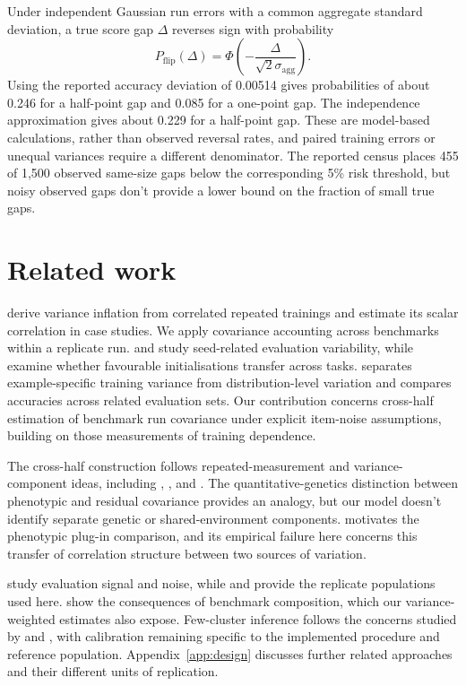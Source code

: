 \documentclass{article}
\begin{document}
Under independent Gaussian run errors with a common aggregate standard deviation, a true score gap $\Delta$ reverses sign with probability
\begin{equation}
P_{\mathrm{flip}}(\Delta)=\Phi\left(-\frac{\Delta}{\sqrt{2}\sigma_{\mathrm{agg}}}\right).
\end{equation}
Using the reported accuracy deviation of 0.00514 gives probabilities of about 0.246 for a half-point gap and 0.085 for a one-point gap. The independence approximation gives about 0.229 for a half-point gap. These are model-based calculations, rather than observed reversal rates, and paired training errors or unequal variances require a different denominator. The reported census places 455 of 1,500 observed same-size gaps below the corresponding 5\% risk threshold, but noisy observed gaps don't provide a lower bound on the fraction of small true gaps.

\section{Related work}
\citet{bouthillier2021} derive variance inflation from correlated repeated trainings and estimate its scalar correlation in case studies. We apply covariance accounting across benchmarks within a replicate run. \citet{reimers2017} and \citet{madaan2024} study seed-related evaluation variability, while \citet{dodge2020} examine whether favourable initialisations transfer across tasks. \citet{jordan2024} separates example-specific training variance from distribution-level variation and compares accuracies across related evaluation sets. Our contribution concerns cross-half estimation of benchmark run covariance under explicit item-noise assumptions, building on those measurements of training dependence.

The cross-half construction follows repeated-measurement and variance-component ideas, including \citet{spearman1904}, \citet{cronbach1951}, and \citet{searle1992}. The quantitative-genetics distinction between phenotypic and residual covariance provides an analogy, but our model doesn't identify separate genetic or shared-environment components. \citet{cheverud1988} motivates the phenotypic plug-in comparison, and its empirical failure here concerns this transfer of correlation structure between two sources of variation.

\citet{heineman2025} study evaluation signal and noise, while \citet{magnusson2025} and \citet{vanderwal2025} provide the replicate populations used here. \citet{dehghani2021} show the consequences of benchmark composition, which our variance-weighted estimates also expose. Few-cluster inference follows the concerns studied by \citet{cameron2008} and \citet{mackinnon2017}, with calibration remaining specific to the implemented procedure and reference population. Appendix~\ref{app:design} discusses further related approaches and their different units of replication.
\end{document}
